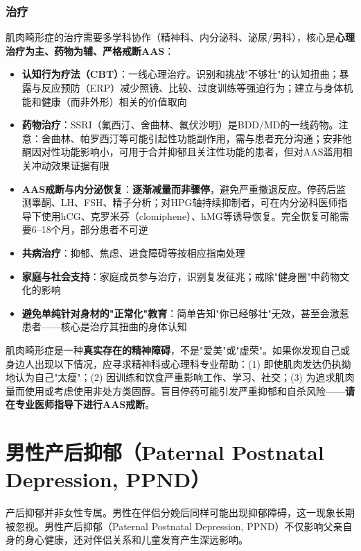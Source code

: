 \documentclass[12pt,a4paper,twoside]{ctexbook}
\begin{document}
\subsubsection{治疗}

肌肉畸形症的治疗需要多学科协作（精神科、内分泌科、泌尿/男科），核心是\textbf{心理治疗为主、药物为辅、严格戒断AAS}：

\begin{itemize}[leftmargin=2cm]
	\item \textbf{认知行为疗法（CBT）}：一线心理治疗。识别和挑战"不够壮"的认知扭曲；暴露与反应预防（ERP）减少照镜、比较、过度训练等强迫行为；建立与身体机能和健康（而非外形）相关的价值取向
	\item \textbf{药物治疗}：SSRI（氟西汀、舍曲林、氟伏沙明）是BDD/MD的一线药物。注意：舍曲林、帕罗西汀等可能引起性功能副作用，需与患者充分沟通；安非他酮因对性功能影响小，可用于合并抑郁且关注性功能的患者，但对AAS滥用相关冲动效果证据有限
	\item \textbf{AAS戒断与内分泌恢复}：\textbf{逐渐减量而非骤停}，避免严重撤退反应。停药后监测睾酮、LH、FSH、精子分析；对HPG轴持续抑制者，可在内分泌科医师指导下使用hCG、克罗米芬（clomiphene）、hMG等诱导恢复。完全恢复可能需要6--18个月，部分患者不可逆
	\item \textbf{共病治疗}：抑郁、焦虑、进食障碍等按相应指南处理
	\item \textbf{家庭与社会支持}：家庭成员参与治疗，识别复发征兆；戒除"健身圈"中药物文化的影响
	\item \textbf{避免单纯针对身材的"正常化"教育}：简单告知"你已经够壮"无效，甚至会激惹患者——核心是治疗其扭曲的身体认知
\end{itemize}

\begin{tcolorbox}[colback=pink!5!white,colframe=red!50!black,title=贴心小叮咛]
肌肉畸形症是一种\textbf{真实存在的精神障碍}，不是"爱美"或"虚荣"。如果你发现自己或身边人出现以下情况，应寻求精神科或心理科专业帮助：(1) 即使肌肉发达仍执拗地认为自己"太瘦"；(2) 因训练和饮食严重影响工作、学习、社交；(3) 为追求肌肉量而使用或考虑使用非处方类固醇。盲目停药可能引发严重抑郁和自杀风险——\textbf{请在专业医师指导下进行AAS戒断}。
\end{tcolorbox}

\section{男性产后抑郁（Paternal Postnatal Depression, PPND）}


产后抑郁并非女性专属。男性在伴侣分娩后同样可能出现抑郁障碍，这一现象长期被忽视。男性产后抑郁（Paternal Postnatal Depression, PPND）不仅影响父亲自身的身心健康，还对伴侣关系和儿童发育产生深远影响。
\end{document}

